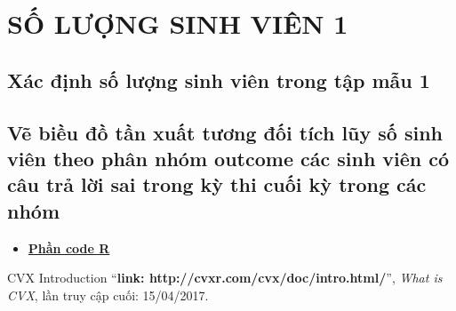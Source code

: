 \documentclass[a4paper]{article}
\begin{document}
\newpage
\section{SỐ LƯỢNG SINH VIÊN 1}
\subsection{Xác định số lượng sinh viên trong tập mẫu 1}
\newpage
\subsection{Vẽ biều đồ tần xuất tương đối tích lũy số sinh viên theo phân nhóm outcome các sinh viên có câu trả lời sai trong kỳ thi cuối kỳ trong các nhóm}
\begin{itemize}
    \item \large\bfseries\underline {Phần code R} \newline
\end{itemize}

\newpage
\begin{thebibliography}{80}

    CVX Introduction
    ``\textbf{link: http://cvxr.com/cvx/doc/intro.html/}'',
    \textit{What is CVX}, lần truy cập cuối: 15/04/2017.

\end{thebibliography}
\end{document}
